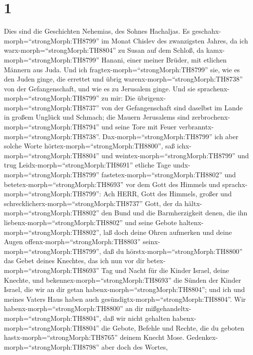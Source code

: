 \hypertarget{section}{%
\section{1}\label{section}}

 Dies sind die Geschichten Nehemias, des Sohnes Hachaljas.
Es geschahx-morph=``strongMorph:TH8799'' im Monat Chislev des
zwanzigsten Jahres, da ich warx-morph=``strongMorph:TH8804'' zu Susan
auf dem Schloß,  da kamx-morph=``strongMorph:TH8799''
Hanani, einer meiner Brüder, mit etlichen Männern aus Juda. Und ich
fragtex-morph=``strongMorph:TH8799'' sie, wie es den Juden ginge, die
errettet und übrig warenx-morph=``strongMorph:TH8738'' von der
Gefangenschaft, und wie es zu Jerusalem ginge.  Und sie
sprachenx-morph=``strongMorph:TH8799'' zu mir: Die
übrigenx-morph=``strongMorph:TH8737'' von der Gefangenschaft sind
daselbst im Lande in großem Unglück und Schmach; die Mauern Jerusalems
sind zerbrochenx-morph=``strongMorph:TH8794'' und seine Tore mit Feuer
verbranntx-morph=``strongMorph:TH8738''. 
Dax-morph=``strongMorph:TH8799'' ich aber solche Worte
hörtex-morph=``strongMorph:TH8800'', saß
ichx-morph=``strongMorph:TH8804'' und
weintex-morph=``strongMorph:TH8799'' und trug
Leidx-morph=``strongMorph:TH8691'' etliche Tage
undx-morph=``strongMorph:TH8799'' fastetex-morph=``strongMorph:TH8802''
und betetex-morph=``strongMorph:TH8693'' vor dem Gott des Himmels
 und sprachx-morph=``strongMorph:TH8799'': Ach HERR, Gott
des Himmels, großer und schrecklicherx-morph=``strongMorph:TH8737''
Gott, der da hältx-morph=``strongMorph:TH8802'' den Bund und die
Barmherzigkeit denen, die ihn liebenx-morph=``strongMorph:TH8802'' und
seine Gebote haltenx-morph=``strongMorph:TH8802'',  laß doch
deine Ohren aufmerken und deine Augen
offenx-morph=``strongMorph:TH8803'' seinx-morph=``strongMorph:TH8799'',
daß du hörstx-morph=``strongMorph:TH8800'' das Gebet deines Knechtes,
das ich nun vor dir betex-morph=``strongMorph:TH8693'' Tag und Nacht für
die Kinder Israel, deine Knechte, und
bekennex-morph=``strongMorph:TH8693'' die Sünden der Kinder Israel, die
wir an dir getan habenx-morph=``strongMorph:TH8804''; und ich und meines
Vaters Haus haben auch gesündigtx-morph=``strongMorph:TH8804''.
 Wir habenx-morph=``strongMorph:TH8800'' an dir
mißgehandeltx-morph=``strongMorph:TH8804'', daß wir nicht gehalten
habenx-morph=``strongMorph:TH8804'' die Gebote, Befehle und Rechte, die
du geboten hastx-morph=``strongMorph:TH8765'' deinem Knecht Mose.
 Gedenkex-morph=``strongMorph:TH8798'' aber doch des Wortes,
